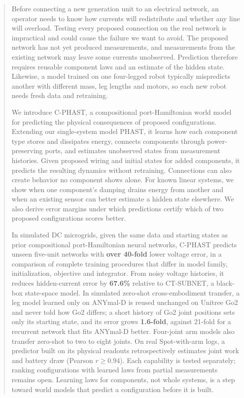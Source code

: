 \begin{abstract}
Before connecting a new generation unit to an electrical network, an operator needs to know how currents will redistribute and whether any line will overload.
Testing every proposed connection on the real network is impractical and could cause the failure we want to avoid.
The proposed network has not yet produced measurements, and measurements from the existing network may leave some currents unobserved.
Prediction therefore requires reusable component laws and an estimate of the hidden state.
Likewise, a model trained on one four-legged robot typically mispredicts another with different mass, leg lengths and motors, so each new robot needs fresh data and retraining.

We introduce C-PHAST, a compositional port-Hamiltonian world model for predicting the physical consequences of proposed configurations.
Extending our single-system model PHAST, it learns how each component type stores and dissipates energy, connects components through power-preserving ports, and estimates unobserved states from measurement histories.
Given proposed wiring and initial states for added components, it predicts the resulting dynamics without retraining.
Connections can also create behavior no component shows alone.
For known linear systems, we show when one component's damping drains energy from another and when an existing sensor can better estimate a hidden state elsewhere.
We also derive error margins under which predictions certify which of two proposed configurations scores better.

In simulated DC microgrids, given the same data and starting states as prior compositional port-Hamiltonian neural networks, C-PHAST predicts unseen five-unit networks with \textbf{over 40-fold} lower voltage error, in a comparison of complete training procedures that differ in model family, initialization, objective and integrator.
From noisy voltage histories, it reduces hidden-current error by \textbf{67.6\%} relative to CT-SUBNET, a black-box state-space model.
In simulated zero-shot cross-embodiment transfer, a leg model learned only on ANYmal-D is reused unchanged on Unitree Go2 and never told how Go2 differs; a short history of Go2 joint positions sets only its starting state, and its error grows \textbf{1.6-fold}, against 21-fold for a recurrent network that fits ANYmal-D better.
Four-joint arm models also transfer zero-shot to two to eight joints.
On real Spot-with-arm logs, a predictor built on its physical readouts retrospectively estimates joint work and battery draw (Pearson $r \geq 0.94$).
Each capability is tested separately; ranking configurations with learned laws from partial measurements remains open.
Learning laws for components, not whole systems, is a step toward world models that predict a configuration before it is built.
\end{abstract}
